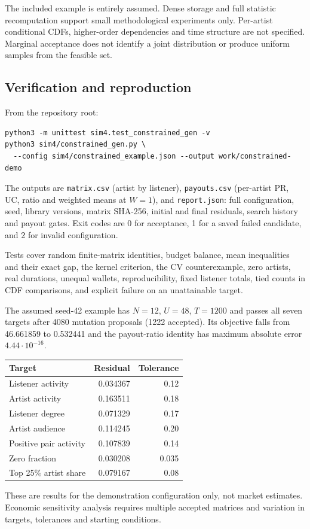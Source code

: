 \documentclass[11pt]{article}
\begin{document}
The included example is entirely assumed. Dense storage and full statistic
recomputation support small methodological experiments only. Per-artist
conditional CDFs, higher-order dependencies and time structure are not
specified. Marginal acceptance does not identify a joint distribution or
produce uniform samples from the feasible set.

\subsection{Verification and reproduction}
From the repository root:
\begin{verbatim}
python3 -m unittest sim4.test_constrained_gen -v
python3 sim4/constrained_gen.py \
  --config sim4/constrained_example.json --output work/constrained-demo
\end{verbatim}
The outputs are \texttt{matrix.csv} (artist by listener),
\texttt{payouts.csv} (per-artist PR, UC, ratio and weighted means at $W=1$),
and \texttt{report.json}: full configuration, seed, library versions, matrix
SHA-256, initial and final residuals, search history and payout gates.
Exit codes are 0 for acceptance, 1 for a saved failed candidate, and 2
for invalid configuration.

Tests cover random finite-matrix identities, budget balance, mean
inequalities and their exact gap, the kernel criterion, the CV
counterexample, zero artists, real durations, unequal wallets,
reproducibility, fixed listener totals, tied counts in CDF comparisons,
and explicit failure on an unattainable target.

The assumed seed-42 example has $N=12$, $U=48$, $T=1200$ and passes all
seven targets after 4080 mutation proposals (1222 accepted). Its objective
falls from 46.661859 to 0.532441 and the payout-ratio identity has maximum
absolute error $4.44\cdot10^{-16}$.
\begin{center}
\begin{tabular}{lrr}
\toprule Target & Residual & Tolerance\\
\midrule
Listener activity & 0.034367 & 0.12\\
Artist activity & 0.163511 & 0.18\\
Listener degree & 0.071329 & 0.17\\
Artist audience & 0.114245 & 0.20\\
Positive pair activity & 0.107839 & 0.14\\
Zero fraction & 0.030208 & 0.035\\
Top 25\% artist share & 0.079167 & 0.08\\
\bottomrule
\end{tabular}
\end{center}
These are results for the demonstration configuration only, not market
estimates. Economic sensitivity analysis requires multiple accepted
matrices and variation in targets, tolerances and starting conditions.
\end{document}
